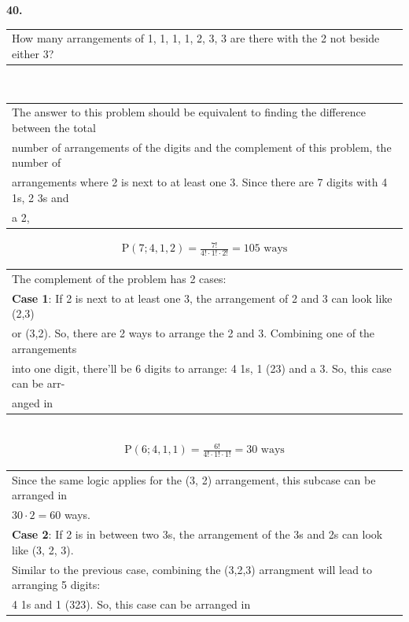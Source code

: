 \documentclass[12pt, letterpaper]{article}
\begin{document}
    \textbf{40.} \begin{tabular}[t]{l} 
        How many arrangements of 1, 1, 1, 1, 2, 3, 3 are there with the 2 not beside either 3?
        \end{tabular} \\ 
        \indent \indent \begin{tabular}[t]{l}
            The answer to this problem should be equivalent to finding the difference between the total \\
            number of arrangements of the digits and the complement of this problem, the number of \\
            arrangements where 2 is next to at least one 3. Since there are 7 digits with 4 1s, 2 3s and \\
            a 2, 
        \end{tabular}
        \begin{align*}
            \text{P}(7; 4, 1, 2) = \frac{7!}{4! \cdot 1! \cdot 2!} = 105 \text{ ways}
            \end{align*}
        \indent \indent \begin{tabular}[t]{l}
             The complement of the problem has 2 cases:  \\
             \indent \textbf{Case 1}: If 2 is next to at least one 3, the arrangement of 2 and 3 can look like (2,3) \\
             or (3,2). So, there are 2 ways to arrange the 2 and 3. Combining one of the arrangements \\
             into one digit, there'll be 6 digits to arrange: 4 1s, 1 (23) and a 3. So, this case can be arr-\\
             anged in
            \end{tabular} \\
            \begin{align*}
                \text{P}(6; 4, 1, 1) = \frac{6!}{4! \cdot 1! \cdot 1!} = 30 \text{ ways}
                \end{align*}
            \indent \indent \begin{tabular}[t]{l}
                Since the same logic applies for the (3, 2) arrangement, this subcase can be arranged in \\
                $30 \cdot 2 = 60$ ways. \\
                \indent \textbf{Case 2}: If 2 is in between two 3s, the arrangement of the 3s and 2s can look like (3, 2, 3). \\
                Similar to the previous case, combining the (3,2,3) arrangment will lead to arranging 5 digits: \\
                4 1s and 1 (323). So, this case can be arranged in
            \end{tabular} \\
\end{document}
